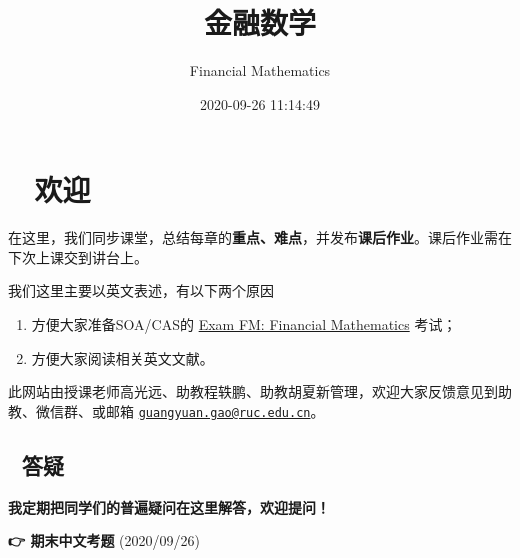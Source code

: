 \documentclass[
]{book}
\title{金融数学}
\author{Financial Mathematics}
\date{2020-09-26 11:14:49}
\begin{document}
\maketitle

{
\setcounter{tocdepth}{1}
\tableofcontents
}
\hypertarget{ux6b22ux8fce}{%
\chapter*{👨‍🏫 欢迎}\label{ux6b22ux8fce}}

在这里，我们同步课堂，总结每章的\textbf{重点、难点}，并发布\textbf{课后作业}。课后作业需在下次上课交到讲台上。

我们这里主要以英文表述，有以下两个原因

\begin{enumerate}
\def\labelenumi{\arabic{enumi}.}
\item
  方便大家准备SOA/CAS的 \href{https://www.soa.org/education/exam-req/edu-exam-fm-detail/}{Exam FM: Financial Mathematics} 考试；
\item
  方便大家阅读相关英文文献。
\end{enumerate}

此网站由授课老师高光远、助教程轶鹏、助教胡夏新管理，欢迎大家反馈意见到助教、微信群、或邮箱 \href{mailto:guangyuan.gao@ruc.edu.cn}{\nolinkurl{guangyuan.gao@ruc.edu.cn}}。

\hypertarget{ux7b54ux7591}{%
\section*{🤔 答疑}\label{ux7b54ux7591}}

\textbf{我定期把同学们的普遍疑问在这里解答，欢迎提问！}

\textbf{👉 期末中文考题} (2020/09/26)
\end{document}
